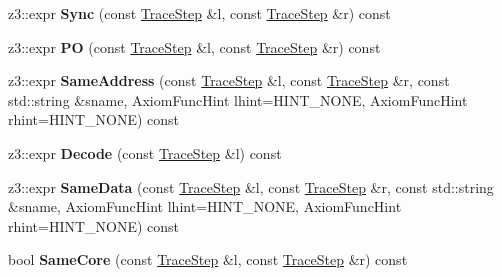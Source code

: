 \begin{DoxyCompactItemize}
\mbox{\label{classilang_1_1_memory_model_a8c0c6bc66ffcec0f22fe6886d0523ca2}} 
z3\+::expr {\bfseries Sync} (const \mbox{\hyperlink{classilang_1_1_trace_step}{Trace\+Step}} \&l, const \mbox{\hyperlink{classilang_1_1_trace_step}{Trace\+Step}} \&r) const
\item 
\mbox{\label{classilang_1_1_memory_model_a0b016eab0847ad6c8dab6af987adfe8e}} 
z3\+::expr {\bfseries PO} (const \mbox{\hyperlink{classilang_1_1_trace_step}{Trace\+Step}} \&l, const \mbox{\hyperlink{classilang_1_1_trace_step}{Trace\+Step}} \&r) const
\item 
\mbox{\label{classilang_1_1_memory_model_a04d8f73e14de1ba8aeab619dab04b69a}} 
z3\+::expr {\bfseries Same\+Address} (const \mbox{\hyperlink{classilang_1_1_trace_step}{Trace\+Step}} \&l, const \mbox{\hyperlink{classilang_1_1_trace_step}{Trace\+Step}} \&r, const std\+::string \&sname, Axiom\+Func\+Hint lhint=H\+I\+N\+T\+\_\+\+N\+O\+NE, Axiom\+Func\+Hint rhint=H\+I\+N\+T\+\_\+\+N\+O\+NE) const
\item 
\mbox{\label{classilang_1_1_memory_model_a94ecaf03c726b7087d75c8c13f890620}} 
z3\+::expr {\bfseries Decode} (const \mbox{\hyperlink{classilang_1_1_trace_step}{Trace\+Step}} \&l) const
\item 
\mbox{\label{classilang_1_1_memory_model_acf8fa08f2020834bbf1104cd461d6edc}} 
z3\+::expr {\bfseries Same\+Data} (const \mbox{\hyperlink{classilang_1_1_trace_step}{Trace\+Step}} \&l, const \mbox{\hyperlink{classilang_1_1_trace_step}{Trace\+Step}} \&r, const std\+::string \&sname, Axiom\+Func\+Hint lhint=H\+I\+N\+T\+\_\+\+N\+O\+NE, Axiom\+Func\+Hint rhint=H\+I\+N\+T\+\_\+\+N\+O\+NE) const
\item 
\mbox{\label{classilang_1_1_memory_model_a1b3b00daa11dc929280339c6d63d7afd}} 
bool {\bfseries Same\+Core} (const \mbox{\hyperlink{classilang_1_1_trace_step}{Trace\+Step}} \&l, const \mbox{\hyperlink{classilang_1_1_trace_step}{Trace\+Step}} \&r) const
\item 
\mbox{\label{classilang_1_1_memory_model_a8e2f27eb7ff4ee27dd0fd9b1fce80f97}} 

\end{DoxyCompactItemize}

